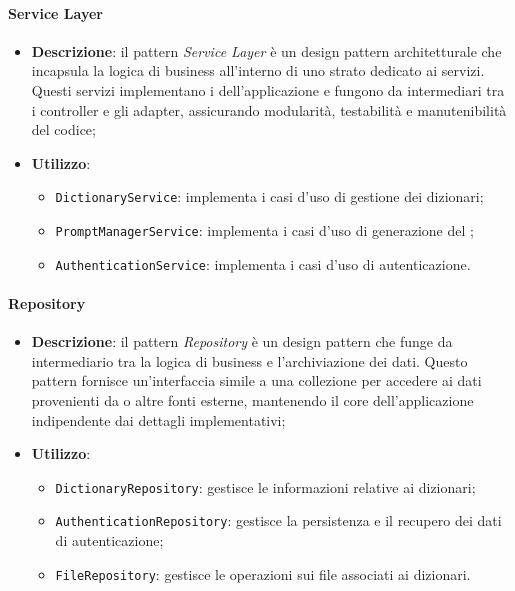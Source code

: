 \paragraph{Service Layer}
\begin{itemize}
    \item \textbf{Descrizione}: il pattern \textit{Service Layer} è un design pattern architetturale che incapsula la logica di business all'interno di uno strato dedicato ai servizi. Questi servizi implementano i  dell'applicazione e fungono da intermediari tra i controller e gli adapter, assicurando modularità, testabilità e manutenibilità del codice;
    \item \textbf{Utilizzo}:
    \begin{itemize}
        \item \texttt{DictionaryService}: implementa i casi d'uso di gestione dei dizionari;
        \item \texttt{PromptManagerService}: implementa i casi d'uso di generazione del ;
        \item \texttt{AuthenticationService}: implementa i casi d'uso di autenticazione.
    \end{itemize}
\end{itemize}

\paragraph{Repository}
\begin{itemize}
    \item \textbf{Descrizione}: il pattern \textit{Repository} è un design pattern che funge da intermediario tra la logica di business e l'archiviazione dei dati. Questo pattern fornisce un'interfaccia simile a una collezione per accedere ai dati provenienti da  o altre fonti esterne, mantenendo il core dell'applicazione indipendente dai dettagli implementativi;
    \item \textbf{Utilizzo}:
    \begin{itemize}
        \item \texttt{DictionaryRepository}: gestisce le informazioni relative ai dizionari;
        \item \texttt{AuthenticationRepository}: gestisce la persistenza e il recupero dei dati di autenticazione;
        \item \texttt{FileRepository}: gestisce le operazioni sui file associati ai dizionari.
    \end{itemize}
\end{itemize}
